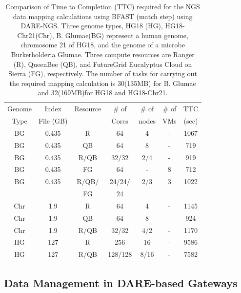 \documentclass[]{article}
\begin{document}
 \begin{table}
\scriptsize
 \begin{tabular}{|c|c|c|c|c|c|c|} 
 \hline 
Genome & Index         & Resource    & \# of & \# of &   \# of         &	TTC  \\
  Type               & File (GB)        & &Cores &   nodes &  VMs&  (sec)\\  
  \hline
 BG &0.435& R&	64 &4&-	&1067 \\
\hline                  
BG &0.435& QB	&	64& 8&-	&719 \\
\hline
 BG &0.435&R/QB	&	32/32 &2/4& -&919 \\
\hline
 BG &0.435& FG &	64 &-&8	&712 \\
\hline
 BG &0.435 &  R/QB/ &	24/24/& 2/3 & 3 &1022\\
 & & FG& 24 &&&\\
\hline
\hline
Chr &1.9& R	&	64& 4 &-&1145 \\
\hline
Chr &1.9& QB	&	64&8&-	&924 \\
\hline
Chr &1.9& R/QB	&	32/32& 4/2&	-&1170 \\
\hline
\hline
HG &127& R	&	256 & 16 &-	&9586\\
\hline
HG &127& R/QB	&	128/128&8/16 & -&7582 \\
\hline
\end{tabular}
\caption{
  Comparison of Time to Completion (TTC) required for the NGS data
  mapping calculations using BFAST (match step) using DARE-NGS.  
  Three genome types,
  HG18 (HG), HG18-Chr21(Chr), B. Glumae(BG) represent a human genome,
  chromosome 21 of HG18, and the genome of a microbe Burkerholderia
  Glumae.  Three compute resources are Ranger (R), QueenBee (QB), and
  FutureGrid  Eucalyptus Cloud on Sierra (FG), respectively.  The
  number of tasks for carrying out the required mapping calculation is
  30(135MB) for B. Glumae and 32(169MB)for HG18 and HG18-Chr21.
}

  \label{table:NGS-Distributed} 
\end{table}

\subsection{Data Management in DARE-based Gateways}
\end{document}

